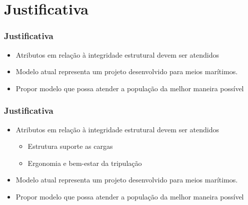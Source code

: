 \documentclass{beamer}
\begin{document}
\section{Justificativa}
\begin{frame}
\tableofcontents[ 
    currentsubsection, 
    hideothersubsections, 
    sectionstyle=show/shaded
    ] 
\end{frame}
\begin{frame}
\frametitle{Justificativa}
\begin{itemize}
\item Atributos em relação à integridade estrutural devem ser atendidos
\item Modelo atual representa um projeto desenvolvido para meios marítimos.
\item Propor modelo que possa atender a população da melhor maneira possível  
\end{itemize}
\end{frame}

\begin{frame}
\frametitle{Justificativa}
\begin{itemize}
	\item \alert{Atributos em relação à integridade estrutural devem ser atendidos}
	\begin{itemize}
		\item Estrutura suporte as cargas
		\item Ergonomia e bem-estar da tripulação
	\end{itemize}
	\item Modelo atual representa um projeto desenvolvido para meios marítimos.
	\item Propor modelo que possa atender a população da melhor maneira possível  
\end{itemize}
\end{frame}
\end{document}
